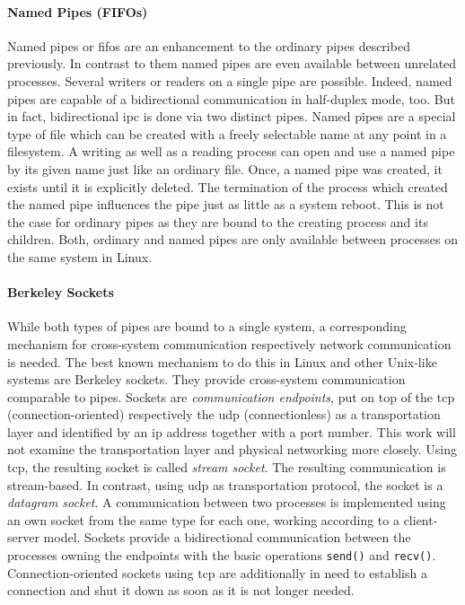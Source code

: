 \paragraph{Named Pipes (FIFOs)}
Named pipes or \acp{fifo} are an enhancement to the ordinary pipes described previously.
In contrast to them named pipes are even available between unrelated processes.
Several writers or readers on a single pipe are possible.
Indeed, named pipes are capable of a bidirectional communication in half-duplex mode, too.
But in fact, bidirectional \ac{ipc} is done via two distinct pipes\cite{silberschatz2009operating}.
Named pipes are a special type of file which can be created with a freely selectable name at any point in a filesystem.
A writing as well as a reading process can open and use a named pipe by its given name just like an ordinary file\cite{glatz2015betriebssysteme}.
Once, a named pipe was created, it exists until it is explicitly deleted. 
The termination of the process which created the named pipe influences the pipe just as little as a system reboot\cite{silberschatz2009operating}.
This is not the case for ordinary pipes as they are bound to the creating process and its children.
Both, ordinary and named pipes are only available between processes on the same system in Linux\cite{silberschatz2009operating}. 

\paragraph{Berkeley Sockets}
While both types of pipes are bound to a single system, a corresponding mechanism for cross-system communication respectively network communication is needed.
The best known mechanism to do this in Linux and other Unix-like systems are Berkeley sockets.
They provide cross-system communication comparable to pipes\cite{glatz2015betriebssysteme}.
Sockets are \textit{communication endpoints}, put on top of the \ac{tcp} (connection-oriented) respectively the \ac{udp} (connectionless) as a transportation layer and identified by an \ac{ip} address together with a port number\cite{silberschatz2009operating}.
This work will not examine the transportation layer and physical networking more closely.
Using \ac{tcp}, the resulting socket is called \textit{stream socket}.
The resulting communication is stream-based.
In contrast, using \ac{udp} as transportation protocol, the socket is a \textit{datagram socket}\cite{silberschatz2009operating}.
A communication between two processes is implemented using an own socket from the same type for each one, working according to a client-server model.
Sockets provide a bidirectional communication between the processes owning the endpoints with the basic operations \texttt{send()} and \texttt{recv()}.
Connection-oriented sockets using \ac{tcp} are additionally in need to establish a connection and shut it down as soon as it is not longer needed\cite{glatz2015betriebssysteme}.


